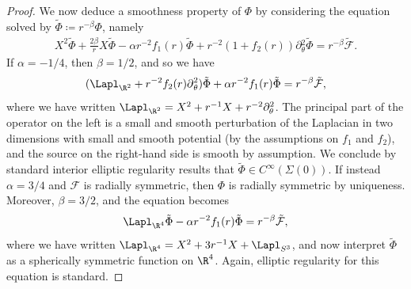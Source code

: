 \documentclass[10pt, reqno]{amsart}
\begin{document}
\begin{proof}
We now deduce a smoothness property of
\(\Phi{}\) by considering the equation solved by \(\tilde{\Phi{}} \coloneqq{} r^{-\beta{}}\Phi{}\),
namely
\begin{equation}
\begin{split}
X^2\tilde{\Phi{}} + \frac{2\beta{}}{r}X\tilde{\Phi{}} - \alpha{}r^{-2}f_1(r)\tilde{\Phi{}} + r^{-2}(1+f_2(r))\partial{}_\theta^2\tilde{\Phi{}} = r^{-\beta{}}\tilde{\mathcal{F}}.
\end{split}
\end{equation}
If \(\alpha{} = -1/4\), then \(\beta{} = 1/2\), and so we have
\begin{equation}
(\Lapl _{\R^2} + r^{-2}f_2(r)\partial{}_{\theta{}}^2)\tilde{\Phi{}} + \alpha{}r^{-2}f_1(r)\tilde{\Phi{}} = r^{-\beta{}} \tilde{\mathcal{F}},
\end{equation}
where we have written \(\Lapl_{\R^2} = X^2 + r^{-1}X + r^{-2}\partial_\theta^2\). The
principal part of the operator on the left is a small and smooth perturbation of
the Laplacian in two dimensions with small and smooth potential (by the
assumptions on \(f_1\) and \(f_2\)), and the source on the right-hand side is smooth
by assumption. We conclude by standard interior elliptic regularity results that
\(\tilde{\Phi{}}\in C^\infty(\Sigma{}(0))\). If instead \(\alpha{} = 3/4\) and
\(\mathcal{F}\) is radially symmetric, then \(\Phi{}\) is radially symmetric by uniqueness.
Moreover, \(\beta{} = 3/2\), and the equation becomes
\begin{equation}
\Lapl _{\R^4}\tilde{\Phi{}} - \alpha{}r^{-2}f_1(r)\tilde{\Phi{}} = r^{-\beta{}} \tilde{\mathcal{F}},
\end{equation}
where we have written \(\Lapl _{\R^4} = X^2 + 3r^{-1}X + \Lapl _{S^3}\), and now interpret
\(\tilde{\Phi{}}\) as a spherically symmetric function on \(\R^4\). Again, elliptic
regularity for this equation is standard.
\end{proof}
\end{document}

